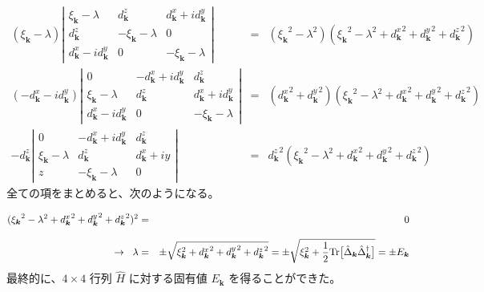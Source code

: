 \documentclass[uplatex,a4j,12pt,dvipdfmx]{jsarticle}
\begin{document}
\begin{eqnarray}
	({\xi_{\bm{k}}} - \lambda)
	\left|
	\begin{array}{ccc}
		{\xi_{\bm{k}}} - \lambda              & {d^{z}_{\bm{k}}}          & {d^{x}_{\bm{k}}} + i{d^{y}_{\bm{k}}} \\[2mm]
		{d^{z}_{\bm{k}}}                      & - {\xi_{\bm{k}}} -\lambda & 0                                      \\[2mm]
		{d^{x}_{\bm{k}}} - i{d^{y}_{\bm{k}}} & 0                          & - {\xi_{\bm{k}}} -\lambda
	\end{array}
	\right|
	&=&
	( {\xi_{\bm{k}}}^{2} - \lambda^{2} )
	( {\xi_{\bm{k}}}^{2} - \lambda^{2} + {d^{x}_{\bm{k}}}^{2} +{d^{y}_{\bm{k}}}^{2} + {d^{z}_{\bm{k}}}^{2} )
	\\[3mm]
	(- {d^{x}_{\bm{k}}} - i{d^{y}_{\bm{k}}})
	\left|
	\begin{array}{ccc}
		0                                      & - {d^{x}_{\bm{k}}} + i{d^{y}_{\bm{k}}} & {d^{z}_{\bm{k}}}                      \\[2mm]
		{\xi_{\bm{k}}} - \lambda              & {d^{z}_{\bm{k}}}                        & {d^{x}_{\bm{k}}} + i{d^{y}_{\bm{k}}} \\[2mm]
		{d^{x}_{\bm{k}}} - i{d^{y}_{\bm{k}}} & 0                                        & - {\xi_{\bm{k}}} -\lambda
	\end{array}
	\right|
	&=&
	({d^{x}_{\bm{k}}}^{2} +{d^{y}_{\bm{k}}}^{2})
	( {\xi_{\bm{k}}}^{2} - \lambda^{2} + {d^{x}_{\bm{k}}}^{2} +{d^{y}_{\bm{k}}}^{2} + {d^{z}_{\bm{k}}}^{2} )
	\\[3mm]
	-
	{d^{z}_{\bm{k}}}
	\left|
	\begin{array}{ccc}
		0                         & - {d^{x}_{\bm{k}}} + i{d^{y}_{\bm{k}}} & {d^{z}_{\bm{k}}}      \\[2mm]
		{\xi_{\bm{k}}} - \lambda & {d^{z}_{\bm{k}}}                        & {d^{x}_{\bm{k}}} + iy \\[2mm]
		z                         & - {\xi_{\bm{k}}} -\lambda               & 0
	\end{array}
	\right|
	&=&
	{d^{z}_{\bm{k}}}^{2}
	( {\xi_{\bm{k}}}^{2} - \lambda^{2} + {d^{x}_{\bm{k}}}^{2} +{d^{y}_{\bm{k}}}^{2} + {d^{z}_{\bm{k}}}^{2} )
\end{eqnarray}
%
全ての項をまとめると、次のようになる。

\begin{eqnarray}
	( {\xi_{\bm{k}}}^{2} - \lambda^{2} + {d^{x}_{\bm{k}}}^{2} +{d^{y}_{\bm{k}}}^{2} + {d^{z}_{\bm{k}}}^{2} )^{2}
	&=&
	0
	\\[3mm]
	\to \hspace{2mm}
	\lambda
	&=&
	\pm \sqrt{ \xi_{\bm{k}}^{2} + {d^{x}_{\bm{k}}}^{2} + {d^{y}_{\bm{k}}}^{2} + {d^{z}_{\bm{k}}}^{2} }
	=
	\pm \sqrt{ \xi_{\bm{k}}^{2} + \dfrac{1}{2} {\rm Tr} \big[ \hat{\Delta}_{\bm{k}} \hat{\Delta}^{\dagger}_{\bm{k}} \big] }
	=
	\pm E_{\bm{k}}
\end{eqnarray}
%
最終的に、$4 \times 4$ 行列 $\hat{H}$ に対する固有値 $E_{\bm{k}}$ を得ることができた。
\end{document}
